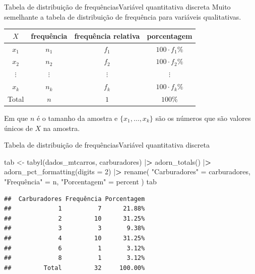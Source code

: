 \documentclass[
  10pt,
  ignorenonframetext,
]{beamer}
\newenvironment{Shaded}{}{}
\newcommand{\DataTypeTok}[1]{#1}
\newcommand{\DecValTok}[1]{#1}
\newcommand{\ErrorTok}[1]{\textcolor[rgb]{1.00,0.00,0.00}{\textbf{#1}}}
\newcommand{\KeywordTok}[1]{\textcolor[rgb]{0.00,0.00,1.00}{#1}}
\newcommand{\NormalTok}[1]{#1}
\newcommand{\OperatorTok}[1]{#1}
\newcommand{\StringTok}[1]{\textcolor[rgb]{0.00,0.50,0.50}{#1}}
\begin{document}
\begin{frame}{Tabela de distribuição de frequências\newline Variável
quantitativa discreta}
\protect\hypertarget{tabela-de-distribuiuxe7uxe3o-de-frequuxeanciasvariuxe1vel-quantitativa-discreta}{}
Muito semelhante a tabela de distribuição de frequência para variáveis
qualitativas.

\begin{longtable}[]{@{}cccc@{}}
\toprule
\(X\) & frequência & frequência relativa & porcentagem\tabularnewline
\midrule
\endhead
\(x_1\) & \(n_1\) & \(f_1\) & \(100 \cdot f_1\%\)\tabularnewline
\(x_2\) & \(n_2\) & \(f_2\) & \(100 \cdot f_2\%\)\tabularnewline
\(\vdots\) & \(\vdots\) & \(\vdots\) & \(\vdots\)\tabularnewline
\(x_k\) & \(n_k\) & \(f_k\) & \(100 \cdot f_k\%\)\tabularnewline
Total & \(n\) & \(1\) & \(100\%\)\tabularnewline
\bottomrule
\end{longtable}

Em que \(n\) é o tamanho da amostra e \(\{x_1, \dots, x_k\}\) são os
números que são valores únicos de \(X\) na amostra.
\end{frame}

\begin{frame}[fragile]{Tabela de distribuição de
frequências\newline Variável quantitativa discreta}
\protect\hypertarget{tabela-de-distribuiuxe7uxe3o-de-frequuxeanciasvariuxe1vel-quantitativa-discreta-1}{}
\begin{Shaded}
\begin{Highlighting}[]
\NormalTok{tab \textless{}{-}}\StringTok{ }\KeywordTok{tabyl}\NormalTok{(dados\_mtcarros, carburadores)  }\OperatorTok{|}\ErrorTok{\textgreater{}}
\StringTok{  }\KeywordTok{adorn\_totals}\NormalTok{()  }\OperatorTok{|}\ErrorTok{\textgreater{}}
\StringTok{  }\KeywordTok{adorn\_pct\_formatting}\NormalTok{(}\DataTypeTok{digits =} \DecValTok{2}\NormalTok{) }\OperatorTok{|}\ErrorTok{\textgreater{}}
\StringTok{  }\KeywordTok{rename}\NormalTok{(}
    \StringTok{"Carburadores"}\NormalTok{ =}\StringTok{ }\NormalTok{carburadores, }\StringTok{"Frequência"}\NormalTok{ =}\StringTok{ }\NormalTok{n,}
    \StringTok{"Porcentagem"}\NormalTok{ =}\StringTok{ }\NormalTok{percent}
\NormalTok{  )}
\NormalTok{tab}
\end{Highlighting}
\end{Shaded}

\begin{verbatim}
##  Carburadores Frequência Porcentagem
##             1          7      21.88%
##             2         10      31.25%
##             3          3       9.38%
##             4         10      31.25%
##             6          1       3.12%
##             8          1       3.12%
##         Total         32     100.00%
\end{verbatim}
\end{frame}
\end{document}
